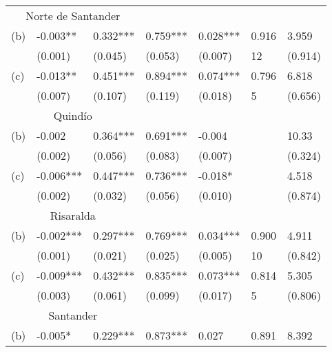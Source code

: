 \begin{table}[H]
\centering
\begin{tabular}{lllllll}
\multicolumn{3}{c}{Norte de Santander} &       &       &       &  \\
\vspace{-0.3cm} (b) & -0.003** & 0.332*** & 0.759*** & 0.028*** & 0.916 & 3.959\\   
& \scriptsize{(0.001)} & \scriptsize{(0.045)} & \scriptsize{(0.053)} & \scriptsize{(0.007)} & \scriptsize{12}    & \scriptsize{(0.914)} \\
\vspace{-0.3cm} (c) & -0.013** & 0.451*** & 0.894*** & 0.074*** & 0.796 & 6.818\\   
& \scriptsize{(0.007)} & \scriptsize{(0.107)} & \scriptsize{(0.119)} & \scriptsize{(0.018)} & \scriptsize{5}     & \scriptsize{(0.656)} \\
\hline \multicolumn{3}{c}{Quindío} &       &       &       &  \\
\vspace{-0.3cm} (b) & -0.002 & 0.364*** & 0.691*** & -0.004 &       & 10.33 \\  
& \scriptsize{(0.002)} & \scriptsize{(0.056)} & \scriptsize{(0.083)} & \scriptsize{(0.007)} &       & \scriptsize{(0.324)} \\
\vspace{-0.3cm} (c) & -0.006*** & 0.447*** & 0.736*** & -0.018* &       & 4.518\\   
& \scriptsize{(0.002)} & \scriptsize{(0.032)} & \scriptsize{(0.056)} & \scriptsize{(0.010)} &       & \scriptsize{(0.874)} \\
\hline \multicolumn{3}{c}{Risaralda} &       &       &       &  \\
\vspace{-0.3cm} (b) & -0.002*** & 0.297*** & 0.769*** & 0.034*** & 0.900 & 4.911\\   
& \scriptsize{(0.001)} & \scriptsize{(0.021)} & \scriptsize{(0.025)} & \scriptsize{(0.005)} & \scriptsize{10}    & \scriptsize{(0.842)} \\
\vspace{-0.3cm} (c) & -0.009*** & 0.432*** & 0.835*** & 0.073*** & 0.814 & 5.305\\   
& \scriptsize{(0.003)} & \scriptsize{(0.061)} & \scriptsize{(0.099)} & \scriptsize{(0.017)} & \scriptsize{5}    & \scriptsize{(0.806)} \\
\hline \multicolumn{3}{c}{Santander} &       &       &       &  \\
\vspace{-0.3cm} (b) & -0.005* & 0.229*** & 0.873*** & 0.027 & 0.891 & 8.392\\   

\end{tabular}
\end{table}
